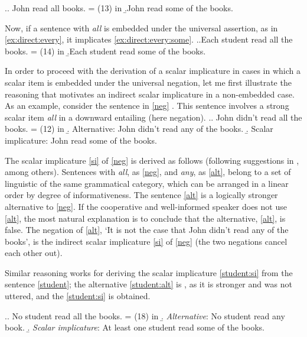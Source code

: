 \ex.\a. \label{ex:direct:all}John read all books. \hfill = (13) in \citealt{Chemla:09}
\b.\label{ex:direct:some}John read some of the books.

Now, if a sentence with \textit{all} is embedded under the universal assertion, as in \ref{ex:direct:every}, it implicates \ref{ex:direct:every:some}.
\ex.\a.\label{ex:direct:every}Each student read all the books. \hfill = (14) in \citealt{Chemla:09}
\b.\label{ex:direct:every:some}Each student read some of the books.

In order to proceed with the derivation of a scalar implicature in cases in which a scalar item is embedded under the universal negation, let me first illustrate the reasoning that motivates an indirect scalar implicature in a non-embedded  case. As an example, consider the sentence in \ref{neg} \citep[taken from][]{Chemla:09}. This sentence involves a strong scalar item \textit{all} in a downward entailing  (here negation).
\ex.\a. \label{neg} John didn't read all the books. \hfill = (12) in \citealt{Chemla:09}
\b. \label{alt} Alternative: John didn't read any of the books.
\b. \label{si} Scalar implicature: John read some of the books.

The scalar implicature \ref{si} of \ref{neg} is derived as follows (following suggestions in \citealp{Grice:75, Ducrot:69, Horn:72}, among others). Sentences with \textit{all}, as \ref{neg}, and \textit{any}, as \ref{alt}, belong to a set of linguistic  of the same grammatical category, which can be arranged in a linear order by degree of informativeness. The sentence \ref{alt} is a logically stronger alternative to \ref{neg}. If the cooperative and well-informed speaker does not use \ref{alt}, the most natural explanation is to conclude that the alternative, \ref{alt}, is false. The negation of \ref{alt}, `It is not the case that John didn't read any of the books', is the indirect scalar implicature \ref{si} of \ref{neg} (the two negations cancel each other out).

Similar reasoning works for deriving the scalar implicature \ref{student:si} from the sentence \ref{student}; the alternative \ref{student:alt} is , as it is stronger and was not uttered, and the  \ref{student:si} is obtained.

\ex.\a. \label{student}No student read all the books. \hfill = (18) in \citealt{Chemla:09}
\b. \label{student:alt} \textit{Alternative}: No student read any book.
\b. \label{student:si} \textit{Scalar implicature}: At least one student read some of the books.

